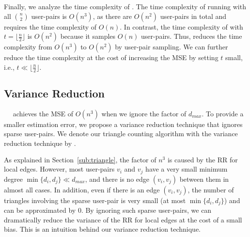 Finally, we analyze the time complexity of \AlgWSTri{}.
The time complexity of running \AlgWSLE{} with all $\binom{n}{2}$ user-pairs is $O(n^3)$, as there are $O(n^2)$ user-pairs in total and \AlgWSLE{} requires the time complexity of $O(n)$.
In contrast, the time complexity of \AlgWSTri{} with $t = \lfloor \frac{n}{2} \rfloor$ is $O(n^2)$ because it samples $O(n)$ user-pairs.
Thus, \AlgWSTri{} reduces the time complexity from $O(n^3)$ to $O(n^2)$ by user-pair sampling.
We can further reduce the time complexity at the cost of increasing the MSE by setting $t$ small,
i.e., $t \ll \lfloor \frac{n}{2} \rfloor$.

\subsection{Variance Reduction}
\label{sub:var_red}
~~\AlgWSTri{}
achieves the MSE of $O(n^3)$ when we ignore the factor of $d_{max}$.
To provide a smaller estimation error,
we propose a variance reduction technique that ignores sparse user-pairs.
We denote our triangle counting algorithm with the variance reduction technique by \AlgWSTriVR{}.

As explained in Section~\ref{sub:triangle}, the factor of $n^3$ is caused by the RR for local edges.
However, most user-pairs $v_i$ and $v_j$ have a very small minimum degree
$\min\{d_i, d_j\} \ll d_{max}$,
and there is no edge $(v_i, v_j)$ between them in almost all cases.
In addition, even if there is an edge $(v_i, v_j)$, the number of triangles involving the sparse user-pair is very small
(at most $\min\{d_i, d_j\}$)
and can be approximated by $0$.
By ignoring such sparse user-pairs, we can dramatically reduce the variance of the RR for local edges at the cost of a small bias.
This is an intuition behind our variance reduction technique.

